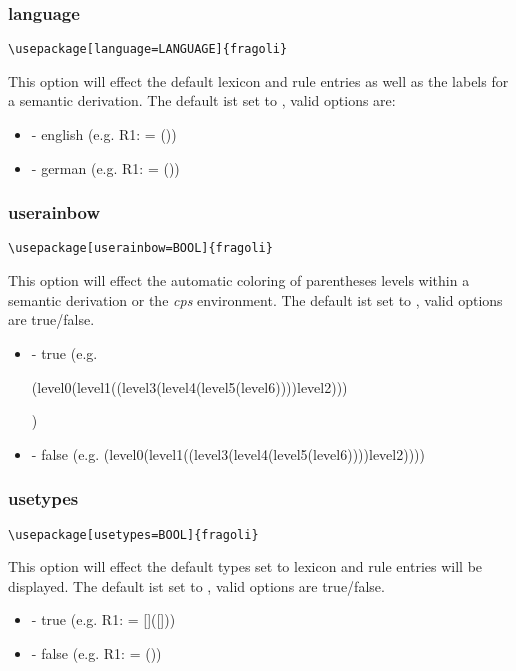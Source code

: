 \documentclass[10pt, a4paper]{article}
\newenvironment{itemizeexample}{
	\begin{itemize}
		\setlength\itemsep{-.5em}
	}
	{
	\end{itemize}
}
\begin{document}
	\subsubsection{language}
	\begin{lstlisting}[style=A]
	\usepackage[language=LANGUAGE]{fragoli}
	\end{lstlisting}
	This option will effect the default lexicon and rule entries as well as the labels for a semantic derivation. The default ist set to \texttt{}, valid options are:
	\begin{itemizeexample}
		\item[-] english (e.g. R1:  = (\lambheN{}))
		\item[-] german (e.g. R1:  = (\lambheN{}))
	\end{itemizeexample}
	\subsubsection{userainbow}
	\begin{lstlisting}[style=A]
	\usepackage[userainbow=BOOL]{fragoli}
	\end{lstlisting}
	This option will effect the automatic coloring of parentheses levels within a semantic derivation or the \textit{cps} environment. The default ist set to \texttt{}, valid options are true/false.
	\begin{itemizeexample}
		\item[-] true (e.g. \begin{cps}(level0(level1((level3(level4(level5(level6))))level2)))\end{cps})
		\item[-] false (e.g. (level0(level1((level3(level4(level5(level6))))level2))))
	\end{itemizeexample}
	\subsubsection{usetypes}
	\begin{lstlisting}[style=A]
	\usepackage[usetypes=BOOL]{fragoli}
	\end{lstlisting}
	This option will effect the default types set to lexicon and rule entries will be displayed. The default ist set to \texttt{}, valid options are true/false.
	\begin{itemizeexample}
		\item[-] true (e.g. R1:  = []([]\lambheN[x][\type{e}]))
		\item[-] false (e.g. R1:  = (\lambheN{}))
	\end{itemizeexample}
\end{document}
